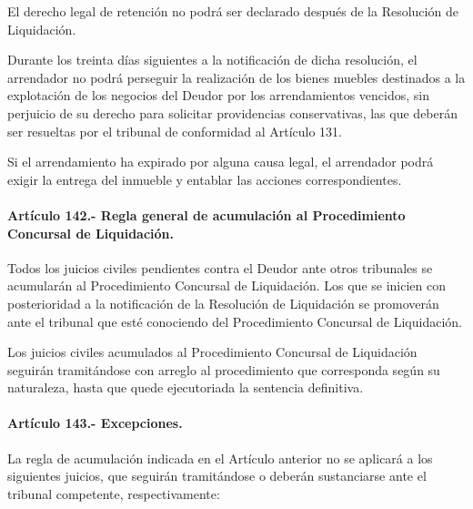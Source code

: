 \documentclass[
]{book}
\begin{document}
El derecho legal de retención no podrá ser declarado después de la Resolución de Liquidación.

Durante los treinta días siguientes a la notificación de dicha resolución, el arrendador no podrá perseguir la realización de los bienes muebles destinados a la explotación de los negocios del Deudor por los arrendamientos vencidos, sin perjuicio de su derecho para solicitar providencias conservativas, las que deberán ser resueltas por el tribunal de conformidad al Artículo 131.

Si el arrendamiento ha expirado por alguna causa legal, el arrendador podrá exigir la entrega del inmueble y entablar las acciones correspondientes.

\hypertarget{artuxedculo-142.--regla-general-de-acumulaciuxf3n-al-procedimiento-concursal-de-liquidaciuxf3n.}{%
\paragraph*{Artículo 142.- Regla general de acumulación al Procedimiento Concursal de Liquidación.}\label{artuxedculo-142.--regla-general-de-acumulaciuxf3n-al-procedimiento-concursal-de-liquidaciuxf3n.}}

Todos los juicios civiles pendientes contra el Deudor ante otros tribunales se acumularán al Procedimiento Concursal de Liquidación. Los que se inicien con posterioridad a la notificación de la Resolución de Liquidación se promoverán ante el tribunal que esté conociendo del Procedimiento Concursal de Liquidación.

Los juicios civiles acumulados al Procedimiento Concursal de Liquidación seguirán tramitándose con arreglo al procedimiento que corresponda según su naturaleza, hasta que quede ejecutoriada la sentencia definitiva.

\hypertarget{artuxedculo-143.--excepciones.}{%
\paragraph*{Artículo 143.- Excepciones.}\label{artuxedculo-143.--excepciones.}}

La regla de acumulación indicada en el Artículo anterior no se aplicará a los siguientes juicios, que seguirán tramitándose o deberán sustanciarse ante el tribunal competente, respectivamente:
\end{document}
